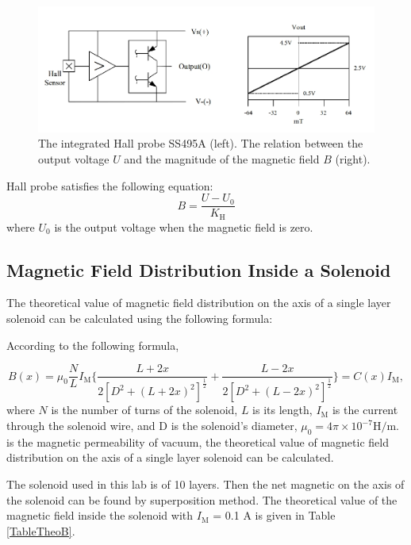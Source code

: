 \documentclass{article}
\begin{document}
\begin{figure}[H]
\centering
\includegraphics[scale=1.2]{circuit.png}
\caption{The integrated Hall probe SS495A (left). The relation between the output voltage $U$ and the magnitude of the magnetic field $B$ (right).}\label{FigCircuit}
\end{figure}

Hall probe satisfies the following equation:
\begin{equation}\label{eqB}
B = \frac{U-U_0}{K_\text{H}}
\end{equation}
where $U_0$ is the output voltage when the magnetic field is zero.


	\subsection{Magnetic Field Distribution Inside a Solenoid}
The theoretical value of magnetic field distribution on the axis of a single layer solenoid can be calculated using the following formula:

According to the following formula,

\begin{equation}\label{eqBx}
B(x) = \mu_0\frac{N}{L}I_\text{M}\{\frac{L+2x}{2[D^2+(L+2x)^2]^{\frac{1}{2}}}+\frac{L-2x}{2[D^2+(L-2x)^2]^{\frac{1}{2}}}\} = C(x)I_\text{M},
\end{equation}
where $N$ is the number of turns of the solenoid, $L$ is its length, $I_\text{M}$ is the current through the solenoid wire, and D is the solenoid's diameter, $\mu_0 = 4\pi \times 10^{-7} \text{H}/\text{m}.$ is the magnetic permeability of vacuum, the theoretical value of magnetic field distribution on the axis of a single layer solenoid can be calculated. 

The solenoid used in this lab is of 10 layers. Then the net magnetic on the axis of the solenoid can be found by superposition method. The theoretical value of the magnetic field inside the solenoid with $I_\text{M}$ = 0.1 A is given in Table \ref{TableTheoB}.
\end{document}
